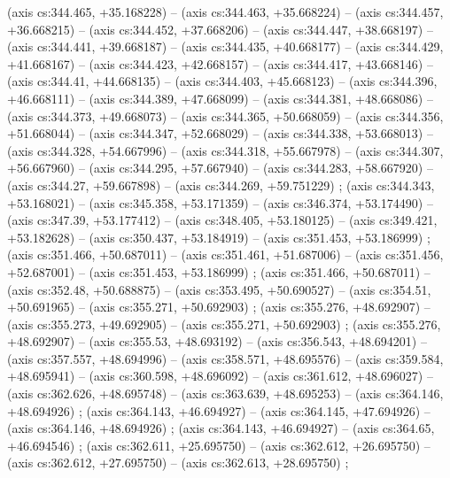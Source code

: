   (axis cs:344.465,    +35.168228) --  (axis cs:344.463,    +35.668224) --  (axis cs:344.457,    +36.668215) --  (axis cs:344.452,    +37.668206) --  (axis cs:344.447,    +38.668197) --  (axis cs:344.441,    +39.668187) --  (axis cs:344.435,    +40.668177) --  (axis cs:344.429,    +41.668167) --  (axis cs:344.423,    +42.668157) --  (axis cs:344.417,    +43.668146) --  (axis cs:344.41,    +44.668135) --  (axis cs:344.403,    +45.668123) --  (axis cs:344.396,    +46.668111) --  (axis cs:344.389,    +47.668099) --  (axis cs:344.381,    +48.668086) --  (axis cs:344.373,    +49.668073) --  (axis cs:344.365,    +50.668059) --  (axis cs:344.356,    +51.668044) --  (axis cs:344.347,    +52.668029) --  (axis cs:344.338,    +53.668013) --  (axis cs:344.328,    +54.667996) --  (axis cs:344.318,    +55.667978) --  (axis cs:344.307,    +56.667960) --  (axis cs:344.295,    +57.667940) --  (axis cs:344.283,    +58.667920) --  (axis cs:344.27,    +59.667898) --  (axis cs:344.269,    +59.751229) ;
    (axis cs:344.343,    +53.168021) --  (axis cs:345.358,    +53.171359) --  (axis cs:346.374,    +53.174490) --  (axis cs:347.39,    +53.177412) --  (axis cs:348.405,    +53.180125) --  (axis cs:349.421,    +53.182628) --  (axis cs:350.437,    +53.184919) --  (axis cs:351.453,    +53.186999) ;
    (axis cs:351.466,    +50.687011) --  (axis cs:351.461,    +51.687006) --  (axis cs:351.456,    +52.687001) --  (axis cs:351.453,    +53.186999) ;
    (axis cs:351.466,    +50.687011) --  (axis cs:352.48,    +50.688875) --  (axis cs:353.495,    +50.690527) --  (axis cs:354.51,    +50.691965) --  (axis cs:355.271,    +50.692903) ;
    (axis cs:355.276,    +48.692907) --  (axis cs:355.273,    +49.692905) --  (axis cs:355.271,    +50.692903) ;
    (axis cs:355.276,    +48.692907) --  (axis cs:355.53,    +48.693192) --  (axis cs:356.543,    +48.694201) --  (axis cs:357.557,    +48.694996) --  (axis cs:358.571,    +48.695576) --  (axis cs:359.584,    +48.695941) --  (axis cs:360.598,    +48.696092) --  (axis cs:361.612,    +48.696027) --  (axis cs:362.626,    +48.695748) --  (axis cs:363.639,    +48.695253) --  (axis cs:364.146,    +48.694926) ;
    (axis cs:364.143,    +46.694927) --  (axis cs:364.145,    +47.694926) --  (axis cs:364.146,    +48.694926) ;
    (axis cs:364.143,    +46.694927) --  (axis cs:364.65,    +46.694546) ;
    (axis cs:362.611,    +25.695750) --  (axis cs:362.612,    +26.695750) --  (axis cs:362.612,    +27.695750) --  (axis cs:362.613,    +28.695750) ;
